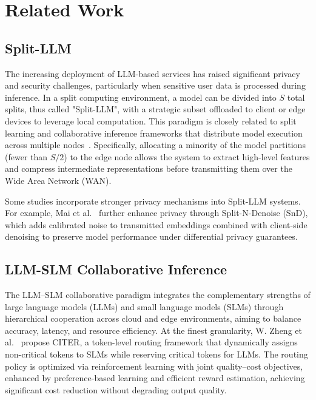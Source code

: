 \documentclass[lettersize,journal]{IEEEtran}
\begin{document}
\section{Related Work}
\label{sec:bg-related}

\subsection{Split-LLM}
The increasing deployment of LLM-based services has raised significant privacy and security challenges, particularly when sensitive user data is processed during inference. In a split computing environment, a model can be divided into $S$ total splits, thus called "Split-LLM", with a strategic subset offloaded to client or edge devices to leverage local computation. This paradigm is closely related to split learning and collaborative inference frameworks that distribute model execution across multiple nodes~\cite{Pham2025,Hukkeri2025,Alhindi2025}. Specifically, allocating a minority of the model partitions (fewer than $S/2$) to the edge node allows the system to extract high-level features and compress intermediate representations before transmitting them over the Wide Area Network (WAN).

Some studies incorporate stronger privacy mechanisms into Split-LLM systems. For example, Mai et al.~\cite{Mai2023} further enhance privacy through Split-N-Denoise (SnD), which adds calibrated noise to transmitted embeddings combined with client-side denoising to preserve model performance under differential privacy guarantees.

\subsection{LLM-SLM Collaborative Inference}
The LLM–SLM collaborative paradigm integrates the complementary strengths of large language models (LLMs) and small language models (SLMs) through hierarchical cooperation across cloud and edge environments, aiming to balance accuracy, latency, and resource efficiency. At the finest granularity, W. Zheng et al.~\cite{WZheng2025} propose CITER, a token-level routing framework that dynamically assigns non-critical tokens to SLMs while reserving critical tokens for LLMs. The routing policy is optimized via reinforcement learning with joint quality–cost objectives, enhanced by preference-based learning and efficient reward estimation, achieving significant cost reduction without degrading output quality.
\end{document}
